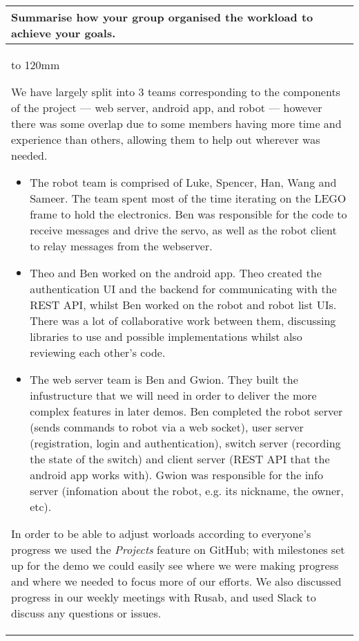 \documentclass[a4paper]{article}
\newcommand{\colWidth}{141mm}
\begin{document}
\begin{center}

\begin{tabular}{|p{\colWidth}|}
	\hline
	\cellcolor{blue!25}\large
	\textbf{Summarise how your group organised the workload to achieve your goals.}
	\\ \hline
	\vtop to 120mm{
		We have largely split into 3 teams corresponding to the components of the project --- web server, android app, and robot --- however there was some overlap due to some members having more time and experience than others, allowing them to help out wherever was needed.

		\begin{itemize}
		\item The robot team is comprised of Luke, Spencer, Han, Wang and Sameer. The team spent most of the time iterating on the LEGO frame to hold the electronics. Ben was responsible for the code to receive messages and drive the servo, as well as the robot client to relay messages from the webserver.
		\item Theo and Ben worked on the android app. Theo created the authentication UI and the backend for communicating with the REST API, whilst Ben worked on the robot and robot list UIs. There was a lot of collaborative work between them, discussing libraries to use and possible implementations whilst also reviewing each other's code. 
		\item The web server team is Ben and Gwion. They built the infustructure that we will need in order to deliver the more complex features in later demos. Ben completed the robot server (sends commands to robot via a web socket), user server (registration, login and authentication), switch server (recording the state of the switch) and client server (REST API that the android app works with). Gwion was responsible for the info server (infomation about the robot, e.g. its nickname, the owner, etc).
		\end{itemize}

		In order to be able to adjust worloads according to everyone's progress we used the \textit{Projects} feature on GitHub; with milestones set up for the demo we could easily see where we were making progress and where we needed to focus more of our efforts.
		We also discussed progress in our weekly meetings with Rusab, and used Slack to discuss any questions or issues.
	}
  \\
  \hline
\end{tabular}
\vskip 5mm



\end{center}
\end{document}
